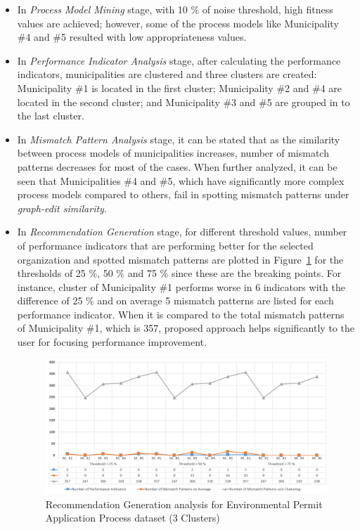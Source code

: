 \begin{itemize}
  \item In \textit{Process Model Mining} stage, with 10 \% of noise threshold, high fitness values are achieved; however, some of the process models like Municipality \#4 and \#5 resulted with low appropriateness values. 
  \item In \textit{Performance Indicator Analysis} stage, after calculating the performance indicators, municipalities are clustered and three clusters are created: Municipality \#1 is located in the first cluster; Municipality \#2 and \#4 are located in the second cluster; and Municipality \#3 and \#5 are grouped in to the last cluster.
  \item In \textit{Mismatch Pattern Analysis} stage, it can be stated that as the similarity between process models of municipalities increases, number of mismatch patterns decreases for most of the cases. When further analyzed, it can be seen that Municipalities \#4 and \#5, which have significantly more complex process models compared to others, fail in spotting mismatch patterns under \textit{graph-edit similarity}.
  \item In \textit{Recommendation Generation} stage, for different threshold values, number of performance indicators that are performing better for the selected organization and spotted mismatch patterns are plotted in Figure~\ref{fig:coselog-wabo-recommendation-generation-analysis} for the thresholds of 25 \%, 50 \% and 75 \% since these are the breaking points. For instance, cluster of Municipality \#1 performs worse in 6 indicators with the difference of 25 \% and on average 5 mismatch patterns are listed for each performance indicator. When it is compared to the total mismatch patterns of Municipality \#1, which is 357, proposed approach helps significantly to the user for focusing performance improvement.
	\begin{figure}
		\centering
		\includegraphics[width=\textwidth]{5_results_discussions/coselog-wabo/recommendation-generation-analysis-k3}
		\caption{Recommendation Generation analysis for Environmental Permit Application Process dataset (3 Clusters)}
	  \label{fig:coselog-wabo-recommendation-generation-analysis}
	\end{figure}
\end{itemize}
